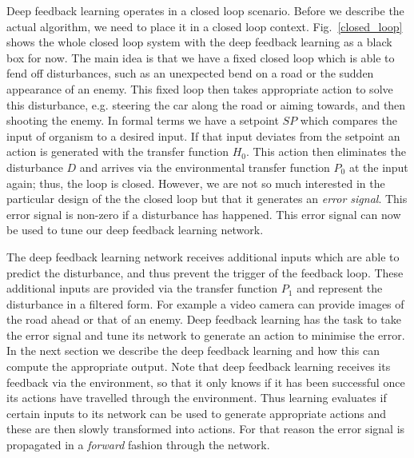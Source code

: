 \documentclass{llncs}
\begin{document}
Deep feedback learning operates in a closed loop scenario. Before we describe
the actual algorithm, we need to place it in a closed loop context. Fig.~\ref{closed_loop} shows the whole closed loop system with the deep
feedback learning as a black box for now. The main idea is that we have a fixed
closed loop which is able to fend off disturbances, such as an unexpected bend on a road or the sudden appearance of an enemy. This fixed loop then
takes appropriate action to solve this disturbance, e.g. steering the car along
the road or aiming towards, and then shooting the enemy. In formal terms we have a setpoint $SP$ which
compares the input of organism to a desired input. If that input deviates from the
setpoint an action is generated with the transfer function $H_0$. This action
then eliminates the disturbance $D$ and arrives via the environmental
transfer function $P_0$ at the input again; thus, the loop is closed. However,
we are not so much interested in the particular design of the the closed loop
but that it generates an \textsl{error signal}. This error signal is non-zero
if a disturbance has happened. This error signal can now be used to tune our
deep feedback learning network.

The deep feedback learning network receives additional inputs which are able
to predict the disturbance, and thus prevent the trigger of the feedback
loop. These additional inputs are provided via the transfer function $P_1$
and represent the disturbance in a filtered form. For example a video camera
can provide images of the road ahead or that of an enemy. Deep feedback
learning has the task to take the error signal and tune its network
to generate an action to minimise the error. In the next section
we describe the deep feedback learning and how this can
compute the appropriate output. Note that deep feedback learning receives
its feedback via the environment, so that it only knows if it has been
successful once its actions have travelled through the environment. Thus learning
evaluates if certain inputs to its network can be used to generate
appropriate actions and these are then slowly transformed into actions.
For that reason the error signal is propagated in a \textsl{forward} fashion
through the network.
\end{document}
